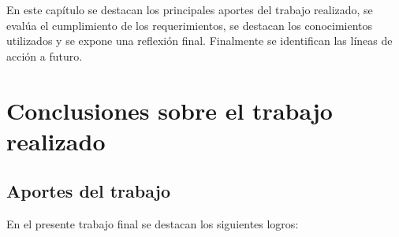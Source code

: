En este capítulo se destacan los principales aportes del trabajo realizado, se evalúa el cumplimiento de los requerimientos, se destacan los conocimientos utilizados y se expone una reflexión final. Finalmente se identifican las líneas de acción a futuro.




\section{Conclusiones sobre el trabajo realizado}




\subsection{Aportes del trabajo}

En el presente trabajo final se destacan los siguientes logros:

